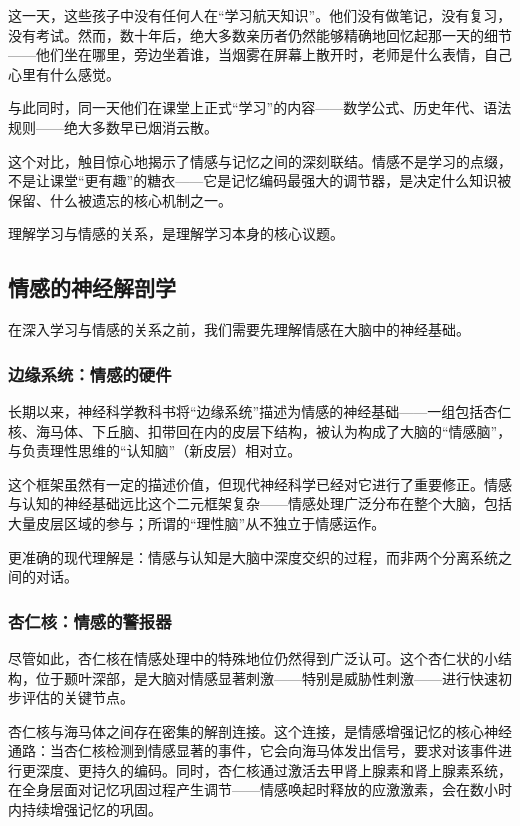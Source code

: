 \documentclass[11pt]{article}
\begin{document}
这一天，这些孩子中没有任何人在“学习航天知识”。他们没有做笔记，没有复习，没有考试。然而，数十年后，绝大多数亲历者仍然能够精确地回忆起那一天的细节——他们坐在哪里，旁边坐着谁，当烟雾在屏幕上散开时，老师是什么表情，自己心里有什么感觉。

与此同时，同一天他们在课堂上正式“学习”的内容——数学公式、历史年代、语法规则——绝大多数早已烟消云散。

这个对比，触目惊心地揭示了情感与记忆之间的深刻联结。情感不是学习的点缀，不是让课堂“更有趣”的糖衣——它是记忆编码最强大的调节器，是决定什么知识被保留、什么被遗忘的核心机制之一。

理解学习与情感的关系，是理解学习本身的核心议题。
\subsection{情感的神经解剖学}
\label{sec:org1a43d4f}

在深入学习与情感的关系之前，我们需要先理解情感在大脑中的神经基础。
\subsubsection{边缘系统：情感的硬件}
\label{sec:org4cb914f}

长期以来，神经科学教科书将“边缘系统”描述为情感的神经基础——一组包括杏仁核、海马体、下丘脑、扣带回在内的皮层下结构，被认为构成了大脑的“情感脑”，与负责理性思维的“认知脑”（新皮层）相对立。

这个框架虽然有一定的描述价值，但现代神经科学已经对它进行了重要修正。情感与认知的神经基础远比这个二元框架复杂——情感处理广泛分布在整个大脑，包括大量皮层区域的参与；所谓的“理性脑”从不独立于情感运作。

更准确的现代理解是：情感与认知是大脑中深度交织的过程，而非两个分离系统之间的对话。
\subsubsection{杏仁核：情感的警报器}
\label{sec:orgcd51e05}

尽管如此，杏仁核在情感处理中的特殊地位仍然得到广泛认可。这个杏仁状的小结构，位于颞叶深部，是大脑对情感显著刺激——特别是威胁性刺激——进行快速初步评估的关键节点。

杏仁核与海马体之间存在密集的解剖连接。这个连接，是情感增强记忆的核心神经通路：当杏仁核检测到情感显著的事件，它会向海马体发出信号，要求对该事件进行更深度、更持久的编码。同时，杏仁核通过激活去甲肾上腺素和肾上腺素系统，在全身层面对记忆巩固过程产生调节——情感唤起时释放的应激激素，会在数小时内持续增强记忆的巩固。
\end{document}
